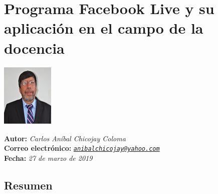 \documentclass[11pt,spanish,Letterpaper,openany]{book}
\begin{document}
\hypertarget{cchicojay}{%
\chapter{Programa Facebook Live y su aplicación en el campo de la docencia}\label{cchicojay}}

\begin {flushleft}

\begin{tcolorbox}[sharp corners=uphill, colback=fondo, colframe=fondo, arc=6mm, boxrule=0mm, boxsep=2mm,  opacityframe=0.19,  opacityback=0.19]

\begin{minipage}[c]{3cm}

\includegraphics[width=2.5cm,height=\textheight]{images/201901-cchicojay-photo.png}

\end{minipage}\begin{minipage}[c]{12cm}

\textbf{Autor:} \emph{Carlos Aníbal Chicojay Coloma}\\
\textbf{Correo electrónico:} \emph{\href{mailto:anibalchicojay@yahoo.com}{\nolinkurl{anibalchicojay@yahoo.com}}}\\
\textbf{Fecha:} \emph{27 de marzo de 2019}

\end{minipage}

\end {tcolorbox}

\end {flushleft}

\hypertarget{resumen-4}{%
\section*{Resumen}\label{resumen-4}}
\end{document}
